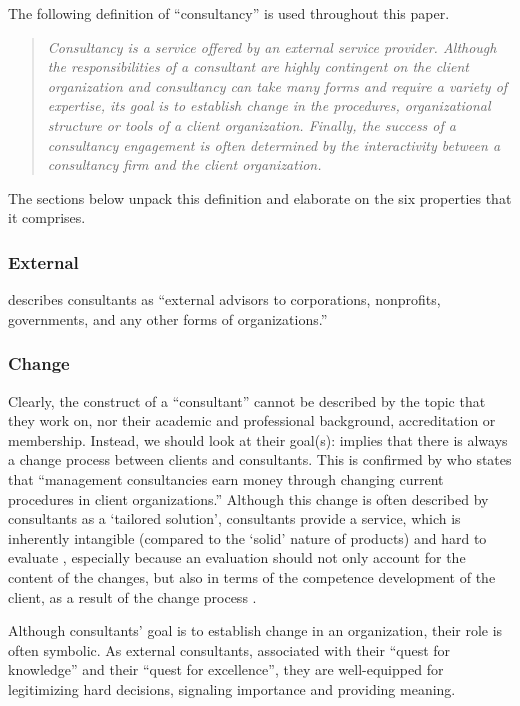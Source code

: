 \documentclass[12pt]{article}
\begin{document}
The following definition of ``consultancy'' is used throughout this
paper.

\begin{quote}
\emph{Consultancy is a service offered by an external service provider.
Although the responsibilities of a consultant are highly contingent on
the client organization and consultancy can take many forms and require
a variety of expertise, its goal is to establish change in the
procedures, organizational structure or tools of a client organization.
Finally, the success of a consultancy engagement is often determined by
the interactivity between a consultancy firm and the client
organization.}
\end{quote}

The sections below unpack this definition and elaborate on the six
properties that it comprises.

\subsubsection{External}\label{external}

\citet[138]{chowdhury2021} describes consultants as ``external advisors
to corporations, nonprofits, governments, and any other forms of
organizations.''

\subsubsection{Change}\label{change}

Clearly, the construct of a ``consultant'' cannot be described by the
topic that they work on, nor their academic and professional background,
accreditation or membership. Instead, we should look at their goal(s):
\citet[1]{werr1986} implies that there is always a change process
between clients and consultants. This is confirmed by
\citet[12]{kipping2000} who states that ``management consultancies earn
money through changing current procedures in client organizations.''
Although this change is often described by consultants as a `tailored
solution', consultants provide a service, which is inherently intangible
(compared to the `solid' nature of products) and hard to evaluate
\citep[ 348]{fincham1999}, especially because an evaluation should not
only account for the content of the changes, but also in terms of the
competence development of the client, as a result of the change process
\citep[ 17]{werr1986}.

Although consultants' goal is to establish change in an organization,
their role is often symbolic. As external consultants, associated with
their ``quest for knowledge'' and their ``quest for excellence'', they
are \citep[ 9-13]{pellegrin2006} well-equipped for legitimizing hard
decisions, signaling importance and providing meaning.
\end{document}
